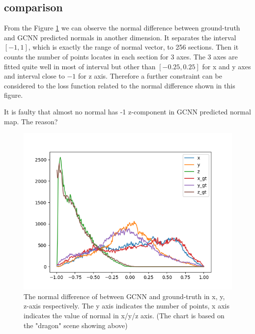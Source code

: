 \documentclass[border=15pt, multi, tikz]{article}
\begin{document}
\subsection{comparison}
From the Figure \ref{fig:normal-histo-diff} we can observe the normal difference between ground-truth and GCNN predicted normals in another dimension. It separates the interval $ \left[ -1,1 \right] $, which is exactly the range of normal vector, to 256 sections. Then it counts the number of points locates in each section for 3 axes.  The 3 axes are fitted quite well in most of interval but other than $ \left[ -0.25,0.25 \right] $ for x and y axes and  interval close to $ -1 $ for z axis. Therefore a further constraint can be considered to the loss function related to the normal difference shown in this figure.

It is faulty that almost no normal has -1 z-component in GCNN predicted normal map. The reason?
\begin{figure}[th]
	\centering
	\includegraphics[width=\linewidth]{./Figures/normal-histo-diff.png}
	\caption{The normal difference of between GCNN and ground-truth in x, y, z-axis respectively. The y axis indicates the number of points, x axis indicates the value of normal in x/y/z axis. (The chart is based on the "dragon" scene showing above)}
	\label{fig:normal-histo-diff}
\end{figure}
	
\end{document}
